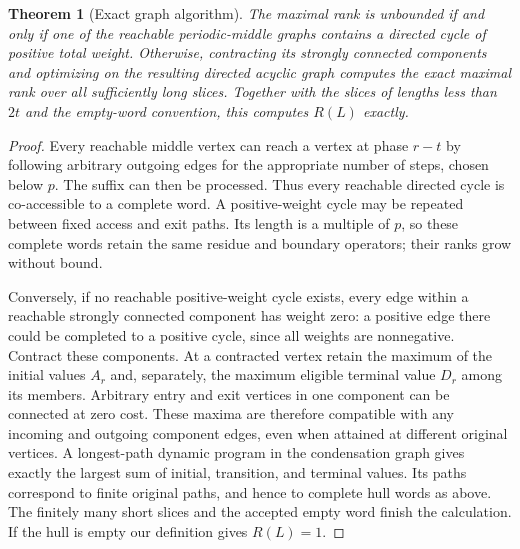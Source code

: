 \documentclass[11pt,letterpaper]{article}
\newtheorem{theorem}{Theorem}[section]
\theoremstyle{definition}
\theoremstyle{remark}
\begin{document}
\begin{theorem}[Exact graph algorithm]\label{ccc:sc:thm:exact-algorithm}
The maximal rank is unbounded if and only if one of the reachable periodic-middle graphs contains a directed cycle of positive total weight. Otherwise, contracting its strongly connected components and optimizing on the resulting directed acyclic graph computes the exact maximal rank over all sufficiently long slices. Together with the slices of lengths less than $2t$ and the empty-word convention, this computes $R(L)$ exactly.
\end{theorem}
\begin{proof}
Every reachable middle vertex can reach a vertex at phase $r-t$ by following arbitrary outgoing edges for the appropriate number of steps, chosen below $p$. The suffix can then be processed. Thus every reachable directed cycle is co-accessible to a complete word. A positive-weight cycle may be repeated between fixed access and exit paths. Its length is a multiple of $p$, so these complete words retain the same residue and boundary operators; their ranks grow without bound.

Conversely, if no reachable positive-weight cycle exists, every edge within a reachable strongly connected component has weight zero: a positive edge there could be completed to a positive cycle, since all weights are nonnegative. Contract these components. At a contracted vertex retain the maximum of the initial values $A_r$ and, separately, the maximum eligible terminal value $D_r$ among its members. Arbitrary entry and exit vertices in one component can be connected at zero cost. These maxima are therefore compatible with any incoming and outgoing component edges, even when attained at different original vertices. A longest-path dynamic program in the condensation graph gives exactly the largest sum of initial, transition, and terminal values. Its paths correspond to finite original paths, and hence to complete hull words as above. The finitely many short slices and the accepted empty word finish the calculation. If the hull is empty our definition gives $R(L)=1$.
\end{proof}
\end{document}
